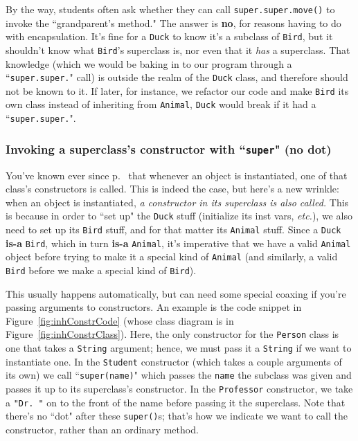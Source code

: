 By the way, students often ask whether they can call
\texttt{super.super.move()} to invoke the ``grandparent's method." The answer
is \textbf{no}, for reasons having to do with encapsulation. It's fine for a
\texttt{Duck} to know it's a subclass of \texttt{Bird}, but it shouldn't know
what \texttt{Bird}'s superclass is, nor even that it \textit{has} a
superclass. That knowledge (which we would be baking in to our program through
a ``\texttt{super.super.}" call) is outside the realm of the \texttt{Duck}
class, and therefore should not be known to it. If later, for instance, we
refactor our code and make \texttt{Bird} its own class instead of inheriting
from \texttt{Animal}, \texttt{Duck} would break if it had a
``\texttt{super.super.}".

\subsubsection{Invoking a superclass's constructor with ``\texttt{super}" (no
dot)}

You've known ever since p.~\pageref{page:instantiateConstructor} that whenever
an object is instantiated, one of that class's constructors is called. This is
indeed the case, but here's a new wrinkle: when an object is instantiated,
\textit{a constructor in its superclass is also called.} This is because in
order to ``set up" the \texttt{Duck} stuff (initialize its inst vars,
\textit{etc.}), we also need to set up its \texttt{Bird} stuff, and for that
matter its \texttt{Animal} stuff. Since a \texttt{Duck} \textbf{is-a}
\texttt{Bird}, which in turn \textbf{is-a} \texttt{Animal}, it's imperative
that we have a valid \texttt{Animal} object before trying to make it a
special kind of \texttt{Animal} (and similarly, a valid \texttt{Bird} before
we make a special kind of \texttt{Bird}).

This usually happens automatically, but can need some special coaxing if
you're passing arguments to constructors. An example is the code snippet in
Figure~\ref{fig:inhConstrCode} (whose class diagram is in
Figure~\ref{fig:inhConstrClass}). Here, the only constructor for the
\texttt{Person} class is one that takes a \texttt{String} argument; hence, we
must pass it a \texttt{String} if we want to instantiate one. In the
\texttt{Student} constructor (which takes a couple arguments of its own) we
call ``\texttt{super(name)}" which passes the \texttt{name} the subclass was
given and passes it up to its superclass's constructor. In the
\texttt{Professor} constructor, we take a \texttt{"Dr. "} on to the front of
the name before passing it the superclass. Note that there's no ``dot" after
these \texttt{super()}s; that's how we indicate we want to call the
constructor, rather than an ordinary method.

